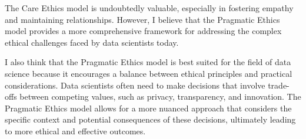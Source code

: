\documentclass[11pt, twoside]{article}
\numberwithin{equation}{section}
\begin{document}
The Care Ethics model is undoubtedly valuable, especially in fostering empathy and maintaining relationships. However, I believe that the Pragmatic Ethics model provides a more comprehensive framework for addressing the complex ethical challenges faced by data scientists today.

I also think that the Pragmatic Ethics model is best suited for the field of data science because it encourages a balance between ethical principles and practical considerations. Data scientists often need to make decisions that involve trade-offs between competing values, such as privacy, transparency, and innovation. The Pragmatic Ethics model allows for a more nuanced approach that considers the specific context and potential consequences of these decisions, ultimately leading to more ethical and effective outcomes.

\clearpage

\printbibliography[heading=bibintoc]
\end{document}
